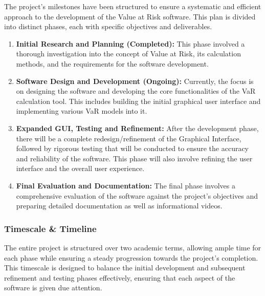 \documentclass{article}
\begin{document}
\newpage
The project's milestones have been structured to ensure a systematic and efficient approach to the development of the Value at Risk software. This plan is divided into distinct phases, each with specific objectives and deliverables.

  \begin{enumerate}
    \item \textbf{Initial Research and Planning (Completed):} This phase involved a thorough investigation into the concept of Value at Risk, its calculation methods, and the requirements for the software development.
    \item \textbf{Software Design and Development (Ongoing):} Currently, the focus is on designing the software and developing the core functionalities of the VaR calculation tool. This includes building the initial graphical user interface and implementing various VaR models into it.
    \item \textbf{Expanded GUI, Testing and Refinement:} After the development phase, there will be a complete redesign/refinement of the Graphical Interface, followed by rigorous testing that will be conducted to ensure the accuracy and reliability of the software. This phase will also involve refining the user interface and the overall user experience.
    \item \textbf{Final Evaluation and Documentation:} The final phase involves a comprehensive evaluation of the software against the project's objectives and preparing detailed documentation as well as informational videos.
  \end{enumerate}

  \subsubsection{Timescale \& Timeline}
  The entire project is structured over two academic terms, allowing ample time for each phase while ensuring a steady progression towards the project's completion. This timescale is designed to balance the initial development and subsequent refinement and testing phases effectively, ensuring that each aspect of the software is given due attention.\\\vspace{0.3cm}
\end{document}
